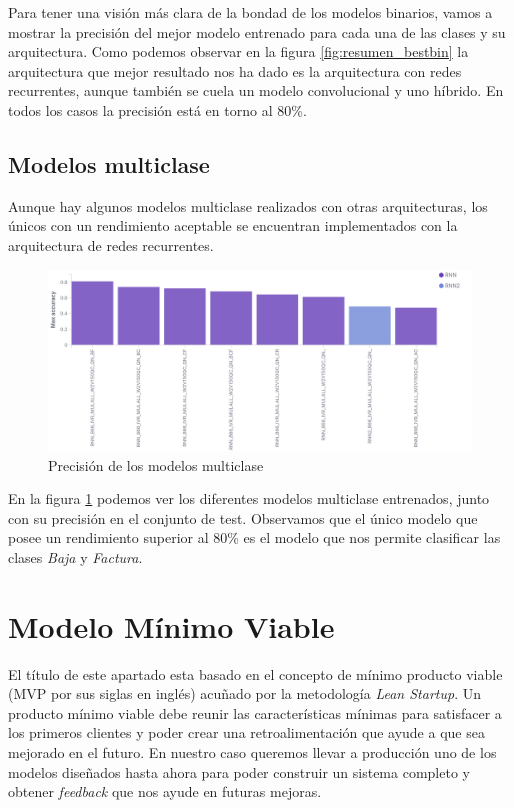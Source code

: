 Para tener una visión más clara de la bondad de los modelos binarios, vamos a mostrar la precisión del mejor modelo entrenado para cada una de las clases y su arquitectura. Como podemos observar en la figura \ref{fig:resumen_bestbin} la arquitectura que mejor resultado nos ha dado es la arquitectura con redes recurrentes, aunque también se cuela un modelo convolucional y uno híbrido. En todos los casos la precisión está en torno al 80\%.

\subsection{Modelos multiclase}

Aunque hay algunos modelos multiclase realizados con otras arquitecturas, los únicos con un rendimiento aceptable se encuentran implementados con la arquitectura de redes recurrentes.

\begin{figure}[!ht]
	\centering
	\includegraphics[width=1\textwidth]{images/super/resumen_multi}
	\caption{Precisión de los modelos multiclase}
	\label{fig:resumen_multi}
\end{figure}


En la figura \ref{fig:resumen_multi}  podemos ver los diferentes modelos multiclase entrenados, junto con su precisión en el conjunto de test. Observamos que el único modelo que posee un rendimiento superior al 80\% es el modelo que nos permite clasificar las clases \textit{Baja} y \textit{Factura}.


\section{Modelo Mínimo Viable}
\label{section:super:mvm}
El título de este apartado esta basado en el concepto de mínimo producto viable (MVP por sus siglas en inglés) acuñado por la metodología \textit{Lean Startup}. Un producto mínimo viable debe reunir las características mínimas para satisfacer a los primeros clientes y poder crear una retroalimentación que ayude a que sea mejorado en el futuro. En nuestro caso queremos llevar a producción uno de los modelos diseñados hasta ahora para poder construir un sistema completo y obtener \textit{feedback} que nos ayude en futuras mejoras.

